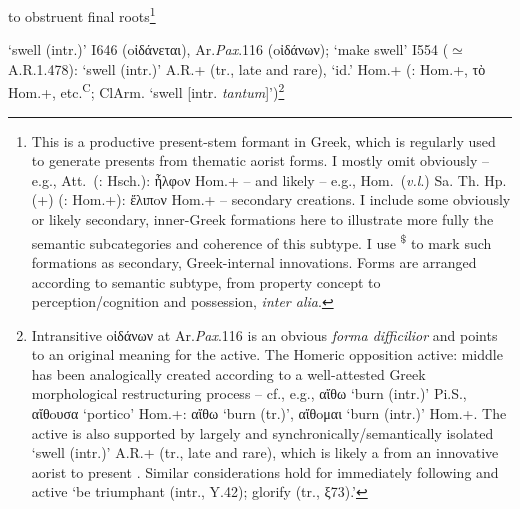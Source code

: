 \documentclass[output=paper,colorlinks,citecolor=brown]{langscibook}
\begin{document}
\begin{exe} 
\ex \label{ex:anw}   to obstruent final roots\footnote{This is a productive present-stem formant in Greek, which is regularly used to generate presents from thematic aorist forms. I mostly omit obviously -- e.g.,   Att.\ (:   Hsch.): ἦλφoν Hom.+ -- and likely -- e.g.,   Hom.\ (\textit{v.l}.) Sa. Th. Hp. (+) (:   Hom.+): ἔλιπoν Hom.+ -- secondary creations. I include some obviously or likely secondary, inner-Greek formations here to illustrate more fully the semantic subcategories and coherence of this subtype. I use \textsuperscript{\$} to mark such formations as secondary, Greek-internal innovations. Forms are arranged according to semantic subtype, from property concept to perception/cognition and possession, \textit{inter alia}.}
\begin{xlist}



\ex {}  ‘swell (intr.)’ I646 (oἰδάνεται), Ar.\textit{Pax}.116 (oἰδάνων); ‘make swell’ I554 ({$\simeq$} A.R.1.478):   ‘swell (intr.)’ A.R.+ (tr., late and rare),   ‘id.’ Hom.+ (:   Hom.+, τὸ   Hom.+, etc.\textsuperscript{C}; ClArm.  ‘swell [intr. \textit{tantum}]’)\footnote{\label{fn:itract}Intransitive oἰδάνων at Ar.\textit{Pax}.116 is an obvious \textit{forma difficilior} and points to an original  meaning for the active. The Homeric opposition  active:  middle has been analogically created according to a well-attested Greek morphological restructuring process -- cf., e.g., {αἴθω}  ‘burn (intr.)’ Pi.S., αἴθoυσα ‘portico’ Hom.+: αἴθω  ‘burn (tr.)', {αἴθoμαι}  ‘burn (intr.)’ Hom.+. The  active is also supported by largely  and synchronically/semantically isolated   ‘swell (intr.)’ A.R.+ (tr., late and rare), which is likely a  from an innovative aorist to present . Similar considerations hold for immediately following  and  active   ‘be triumphant (intr., Y.42); glorify (tr., ξ73).’} 


\end{xlist}
\end{exe}
\end{document}
